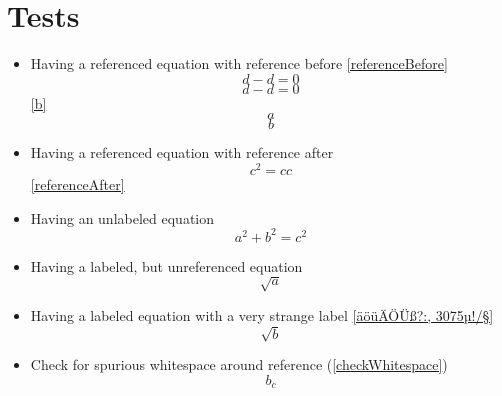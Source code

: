 \documentclass{article}
\begin{document}

	\section*{Tests}
	\begin{itemize}
		\item Having a referenced equation with reference before \ref{referenceBefore}
			\begin{equation}\label{referenceBefore}
				d - d = 0
			\end{equation}
			\begin{equation}\label{referenceNo}
				d - d = 0
			\end{equation}
		\ref{b}\begin{equation}\label{a}a\end{equation}\begin{equation}\label{b}b\end{equation}
		\item Having a referenced equation with reference after
			\begin{equation}\label{referenceAfter}
				c^2 = c c
			\end{equation}
			\ref{referenceAfter}
		\item Having an unlabeled equation
			\begin{equation}\label{abc}
				a^2 + b^2 = c^2
			\end{equation}
		\item Having a labeled, but unreferenced equation
			\begin{equation}\label{unreferenced}
				\sqrt{a}
			\end{equation}
		\item Having a labeled equation with a very strange label \ref{äöüÄÖÜß?:, 3075µ!/§}
			\begin{equation}\label{äöüÄÖÜß?:, 3075µ!/§}
				\sqrt{b}
			\end{equation}
		\item Check for spurious whitespace around reference (\ref{checkWhitespace})
			\begin{equation}\label{checkWhitespace}
				b_c
			\end{equation}

\end{itemize}
\end{document}
